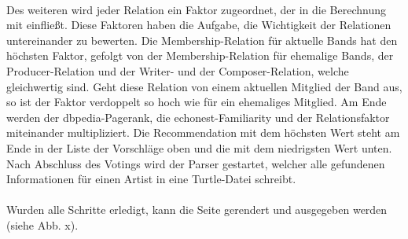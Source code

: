 \paragraph{} Des weiteren wird jeder Relation ein Faktor zugeordnet, der in die Berechnung mit einfließt. Diese Faktoren haben die Aufgabe, die Wichtigkeit der Relationen untereinander zu bewerten. Die Membership-Relation für aktuelle Bands hat den höchsten Faktor, gefolgt von der Membership-Relation für ehemalige Bands, der Producer-Relation und der Writer- und der Composer-Relation, welche gleichwertig sind. Geht diese Relation von einem aktuellen Mitglied der Band aus, so ist der Faktor verdoppelt so hoch wie für ein ehemaliges Mitglied. Am Ende werden der dbpedia-Pagerank, die echonest-Familiarity und der Relationsfaktor miteinander multipliziert. Die Recommendation mit dem höchsten Wert steht am Ende in der Liste der Vorschläge oben und die mit dem niedrigsten Wert unten.
Nach Abschluss des Votings wird der Parser gestartet, welcher alle gefundenen Informationen für einen Artist in eine Turtle-Datei schreibt. %

\paragraph{} Wurden alle Schritte erledigt, kann die Seite gerendert und ausgegeben werden (siehe Abb. x).


